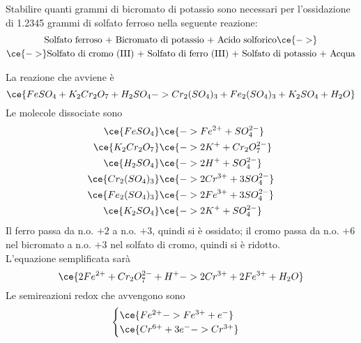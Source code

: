 \begin{esercizio}
    Stabilire quanti grammi di bicromato di potassio sono necessari per l'ossidazione di 1.2345 grammi di solfato ferroso nella seguente reazione:
    \begin{gather*}
        \text{Solfato ferroso + Bicromato di potassio + Acido solforico} \ce{->}
        \\
        \ce{->} \text{Solfato di cromo (III) + Solfato di ferro (III) + Solfato di potassio + Acqua}
    \end{gather*}
\end{esercizio}
\begin{soluzione}
    La reazione che avviene è
    \begin{equation*}
        \ce{FeSO_4 + K_2Cr_2O_7 + H_2SO_4 -> Cr_2(SO_4)_3 + Fe_2(SO_4)_3 + K_2SO_4 + H_2O}
    \end{equation*}
    Le molecole dissociate sono
    \begin{equation*}
        \begin{split}
            \ce{FeSO_4} & \ce{-> Fe^{2+} + SO_4^{2-}}
            \\
            \ce{K_2Cr_2O_7} & \ce{-> 2K^+ + Cr_2O_7^{2-}}
            \\
            \ce{H_2SO_4} & \ce{-> 2H^+ + SO_4^{2-}}
            \\
            \ce{Cr_2(SO_4)_3} & \ce{-> 2Cr^{3+} + 3SO_4^{2-}}
            \\
            \ce{Fe_2(SO_4)_3} & \ce{-> 2Fe^{3+} + 3SO_4^{2-}}
            \\
            \ce{K_2SO_4} & \ce{-> 2K^+ + SO_4^{2-}}
        \end{split}
    \end{equation*}
    Il ferro passa da n.o. $+2$ a n.o. $+3$, quindi si è ossidato; il cromo passa da n.o. $+6$ nel bicromato a n.o. $+3$ nel solfato di cromo, quindi si è ridotto.\\
    L'equazione semplificata sarà
    \begin{equation*}
        \ce{2Fe^{2+} + Cr_2O_7^{2-} + H^+ -> 2Cr^{3+} + 2Fe^{3+} + H_2O}
    \end{equation*}
    Le semireazioni redox che avvengono sono
    \begin{equation*}
        \begin{cases}
            \ce{Fe^{2+} -> Fe^{3+} + e^-}\\
            \ce{Cr^{6+} + 3e^- -> Cr^{3+}}
        \end{cases}
    \end{equation*}

\end{soluzione}
